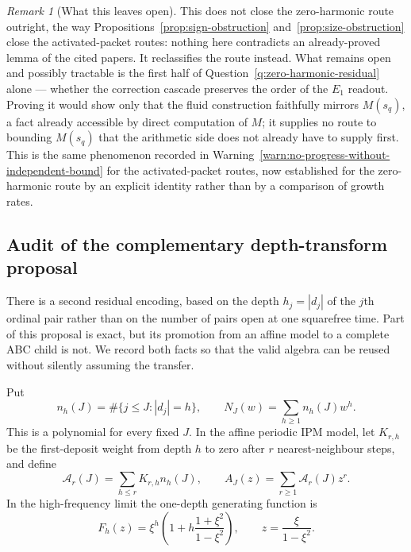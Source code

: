 \documentclass[11pt]{amsart}
\numberwithin{equation}{section}
\theoremstyle{plain}
\theoremstyle{definition}
\theoremstyle{remark}
\newtheorem{remark}[theorem]{Remark}
\begin{document}
\begin{remark}[What this leaves open]
\label{rem:what-genuinely-remains}
This does not close the zero-harmonic route outright, the way
Propositions~\ref{prop:sign-obstruction} and~\ref{prop:size-obstruction}
close the activated-packet routes: nothing here contradicts an already-proved
lemma of the cited papers.  It reclassifies the route instead.  What remains
open and possibly tractable is the first half of
Question~\ref{q:zero-harmonic-residual} alone --- whether the correction
cascade preserves the order of the $E_1$ readout.  Proving it would show only
that the fluid construction faithfully mirrors $M(s_q)$, a fact already
accessible by direct computation of $M$; it supplies no route to bounding
$M(s_q)$ that the arithmetic side does not already have to supply first.
This is the same phenomenon recorded in
Warning~\ref{warn:no-progress-without-independent-bound} for the
activated-packet routes, now established for the zero-harmonic route by an
explicit identity rather than by a comparison of growth rates.
\end{remark}

\subsection{Audit of the complementary depth-transform proposal}
\label{subsec:depth-transform-audit}

There is a second residual encoding, based on the depth
$h_j=|d_j|$ of the $j$th ordinal pair rather than on the number of pairs open
at one squarefree time.  Part of this proposal is exact, but its promotion
from an affine model to a complete ABC child is not.  We record both facts so
that the valid algebra can be reused without silently assuming the transfer.

Put
\begin{equation}
 n_h(J)=\#\{j\le J:|d_j|=h\},\qquad
 N_J(w)=\sum_{h\ge1}n_h(J)w^h.
\label{eq:depth-polynomial}
\end{equation}
This is a polynomial for every fixed $J$.  In the affine periodic IPM model,
let $K_{r,h}$ be the first-deposit weight from depth $h$ to zero after $r$
nearest-neighbour steps, and define
\begin{equation}
 \mathcal A_r(J)=\sum_{h\le r}K_{r,h}n_h(J),\qquad
 A_J(z)=\sum_{r\ge1}\mathcal A_r(J)z^r.
\label{eq:deposit-generating-functions}
\end{equation}
In the high-frequency limit the one-depth generating function is
\begin{equation}
 F_h(z)=\xi^h\left(1+h\frac{1+\xi^2}{1-\xi^2}\right),
 \qquad z=\frac{\xi}{1-\xi^2}.
\label{eq:depth-one-generating-function}
\end{equation}
\end{document}
